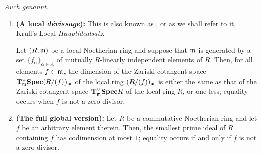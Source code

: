             \begin{lemma} \label{lemma: krull_principal_ideal_theorem} 
                \textit{Auch  genannt}.
                \begin{enumerate}
                    \item \textbf{(A local \textit{d\'evissage}):} This is also known as  \cite[Exercise 12.1.B]{risingsea}, or as we shall refer to it, Krull's Local \textit{Hauptidealsatz}.
                    
                    Let $(R, \mathfrak{m})$ be a local Noetherian ring and suppose that $\mathfrak{m}$ is generated by a set $\{f_{\alpha}\}_{\alpha \in A}$ of mutually $R$-linearly independent elements of $R$. Then, for all elements $f \in \mathfrak{m}$, the dimension of the Zariski cotangent space $\mathbf{T}^{\vee}_{\mathfrak{m}}\mathbf{Spec} (R/(f))_{\mathfrak{m}}$ of the local ring $(R/(f))_{\mathfrak{m}}$ is either the same as that of the Zariski cotangent space $\mathbf{T}^{\vee}_{\mathfrak{m}}\mathbf{Spec} R$ of the local ring $R$, or one less; equality occurs when $f$ is not a zero-divisor.  
                    \item \textbf{(The full global version):} 
                    Let $R$ be a commutative Noetherian ring and let $f$ be an arbitrary element therein. Then, the smallest prime ideal of $R$ containing $f$ has codimension at most $1$; equality occurs if and only if $f$ is not a zero-divisor.
                \end{enumerate}
            \end{lemma}
